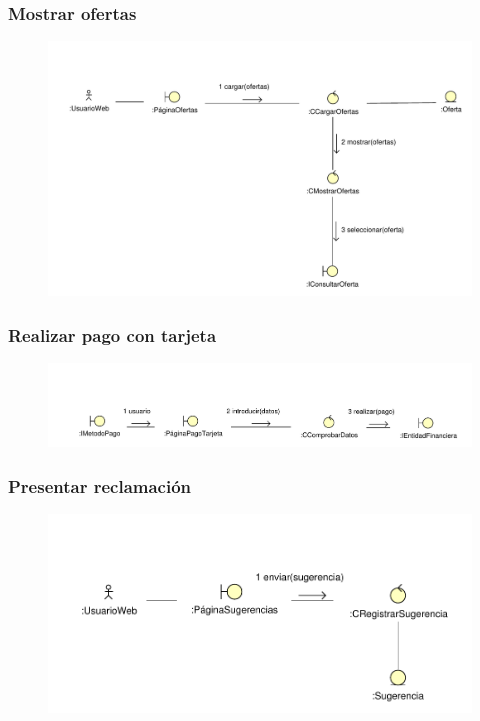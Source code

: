 \documentclass[11pt, a4paper, twoside, titlepage]{article}
\begin{document}
			\subsubsection{Mostrar ofertas}
				\begin{figure}[H]\centering
					\includegraphics[scale=.72]{diagramas/mostrarofertas.pdf}
				\end{figure}

			\subsubsection{Realizar pago con tarjeta} \label{ana:tarjeta}
				\begin{figure}[H]\centering
					\includegraphics[scale=.7]{diagramas/pagotarjeta.pdf}
				\end{figure}

			\subsubsection{Presentar reclamación}
				\begin{figure}[H]\centering
					\includegraphics[scale=.82]{diagramas/presentarreclamacion.pdf}
				\end{figure}
\end{document}
